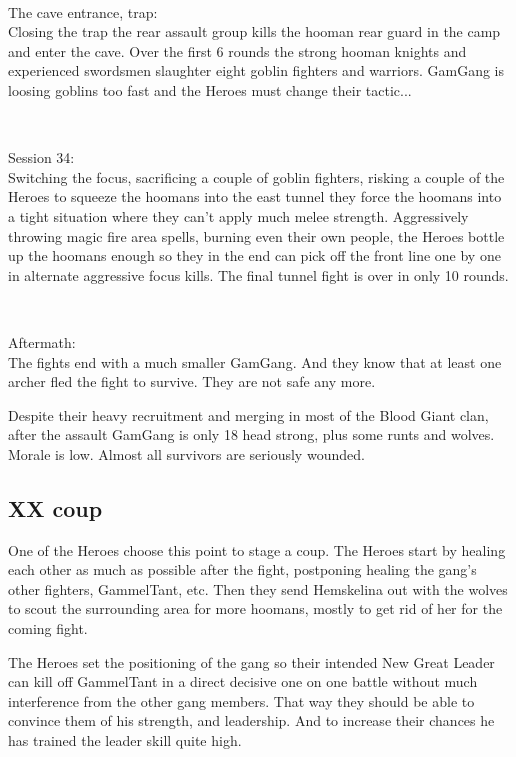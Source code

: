 \

The cave entrance, trap:\\
Closing the trap the rear assault group kills the hooman rear guard in the camp and enter the cave. Over the first 6 rounds the strong hooman knights and experienced swordsmen slaughter eight goblin fighters and warriors. GamGang is loosing goblins too fast and the Heroes must change their tactic...

\

Session 34:\\                                                           %
Switching the focus, sacrificing a couple of goblin fighters, risking a couple of the Heroes to squeeze the hoomans into the east tunnel they force the hoomans into a tight situation where they can't apply much melee strength. Aggressively throwing magic fire area spells, burning even their own people, the Heroes bottle up the hoomans enough so they in the end can pick off the front line one by one in alternate aggressive focus kills. The final tunnel fight is over in only 10 rounds.

\

Aftermath:\\
The fights end with a much smaller GamGang. And they know that at least one archer fled the fight to survive. They are not safe any more.

Despite their heavy recruitment and merging in most of the Blood Giant clan, after the assault GamGang is only 18 head strong, plus some runts and wolves. Morale is low. Almost all survivors are seriously wounded.



\subsection*{XX coup}

One of the Heroes choose this point to stage a coup. The Heroes start by healing each other as much as possible after the fight, postponing healing the gang's other fighters, GammelTant, etc. Then they send Hemskelina out with the wolves to scout the surrounding area for more hoomans, mostly to get rid of her for the coming fight.

The Heroes set the positioning of the gang so their intended New Great Leader can kill off GammelTant in a direct decisive one on one battle without much interference from the other gang members. That way they should be able to convince them of his strength, and leadership. And to increase their chances he has trained the leader skill quite high.

